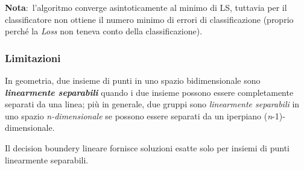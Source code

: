 \noindent \textbf{Nota}:\ l'algoritmo converge asintoticamente al minimo di LS, tuttavia per il classificatore non ottiene il numero minimo di errori di classificazione (proprio perché la \textit{Loss} non teneva conto della classificazione).

\subsubsection{Limitazioni}

In geometria, due insieme di punti in uno spazio bidimensionale sono \textbf{\textit{linearmente separabili}} quando i due insieme possono essere completamente separati da una linea; più in generale, due gruppi sono \textit{linearmente separabili} in uno spazio \textit{n-dimensionale} se possono essere separati da un iperpiano (\textit{n}-1)-dimensionale.\

\vspace{12pt}
\noindent Il decision boundery lineare fornisce soluzioni esatte solo per insiemi di punti linearmente separabili.
